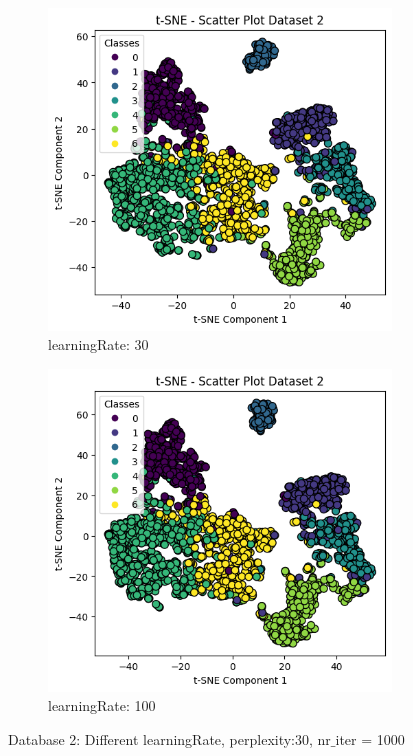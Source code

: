 \documentclass[12pt]{report}
\begin{document}
	\begin{figure}[H]
		\centering
		\begin{subfigure}{.5\textwidth}
			\centering
			\includegraphics[width=.8\linewidth]{../t-SNE/OutputPlot/Dataset2Outputplot/perplexity30learningrate30.png}
			\caption{learningRate: 30}
			\label{Dataset2LearningRate30}
		\end{subfigure}%
		\begin{subfigure}{.5\textwidth}
			\centering
			\includegraphics[width=.8\linewidth]{../t-SNE/OutputPlot/Dataset2Outputplot/perplexity30learningrate100.png}
			\caption{learningRate: 100}
			\label{Dataset2LearningRate100}
		\end{subfigure}
		\caption{Database 2: Different learningRate, perplexity:30, nr$\_$iter = 1000}
		\label{Dataset2DiffLearningRate}
	\end{figure}
	\newpage
\end{document}
